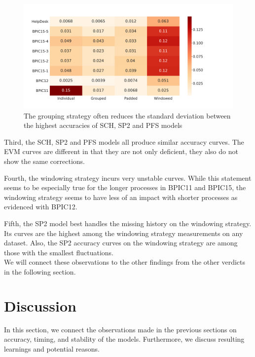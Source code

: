 \begin{figure}
    \centering
    \includegraphics[width=\textwidth]{gfx/grouping-accuracy-harmonization.pdf}
    \caption[Batching strategy harmonizes top accuracies]{The grouping strategy often reduces the standard deviation between the highest accuracies of SCH, SP2 and PFS models}
    \label{fig:grouping-accuracy-harmonization}
\end{figure}

Third, the SCH, SP2 and PFS models all produce similar accuracy curves.
The EVM curves are different in that they are not only deficient, they also do not show the same corrections.

Fourth, the windowing strategy incurs very unstable curves.
While this statement seems to be especially true for the longer processes in BPIC11 and BPIC15, the windowing strategy seems to have less of an impact with shorter processes as evidenced with BPIC12.

Fifth, the SP2 model best handles the missing history on the windowing strategy.
Its curves are the highest among the windowing strategy measurements on any dataset.
Also, the SP2 accuracy curves on the windowing strategy are among those with the smallest fluctuations.\\

We will connect these observations to the other findings from the other verdicts in the following section.

\section{Discussion}\label{sec:eval:discussion}
In this section, we connect the observations made in the previous sections on accuracy, timing, and stability of the models.
Furthermore, we discuss resulting learnings and potential reasons.\\


